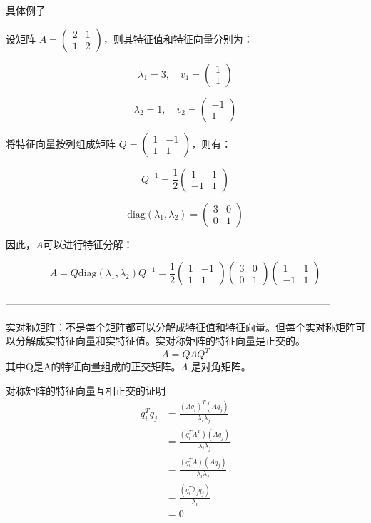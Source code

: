 \documentclass{article}
\begin{document}
具体例子

设矩阵 $A = \begin{pmatrix} 2 & 1 \\ 1 & 2 \end{pmatrix}$，则其特征值和特征向量分别为：

$$\lambda_1 = 3, \quad v_1 = \begin{pmatrix} 1 \\ 1 \end{pmatrix}$$

$$\lambda_2 = 1, \quad v_2 = \begin{pmatrix} -1 \\ 1 \end{pmatrix}$$

将特征向量按列组成矩阵 $Q = \begin{pmatrix} 1 & -1 \\ 1 & 1 \end{pmatrix}$，则有：

$$Q^{-1} = \frac{1}{2} \begin{pmatrix} 1 & 1 \\ -1 & 1 \end{pmatrix}$$

$$\text{diag}(\lambda_1, \lambda_2) = \begin{pmatrix} 3 & 0 \\ 0 & 1 \end{pmatrix}$$

因此，$A$可以进行特征分解：

$$A = Q \text{diag}(\lambda_1, \lambda_2) Q^{-1} = \frac{1}{2} \begin{pmatrix} 1 & -1 \\ 1 & 1 \end{pmatrix} \begin{pmatrix} 3 & 0 \\ 0 & 1 \end{pmatrix} \begin{pmatrix} 1 & 1 \\ -1 & 1 \end{pmatrix}$$

--------------------------------------------------------------------------------------------------

实对称矩阵：不是每个矩阵都可以分解成特征值和特征向量。但每个实对称矩阵可以分解成实特征向量和实特征值。实对称矩阵的特征向量是正交的。
$$A = Q \Lambda Q^T$$
其中Q是A的特征向量组成的正交矩阵。$\Lambda$ 是对角矩阵。

对称矩阵的特征向量互相正交的证明
$$
\begin{aligned}
    q_i^T q_j &= \frac{(Aq_i)^T(Aq_j)}{\lambda_i \lambda_j} \\
    &= \frac{(q_i^T A^T)(Aq_j)}{\lambda_i \lambda_j} \\
    &= \frac{(q_i^T A)(Aq_j)}{\lambda_i \lambda_j} \\
    &= \frac{(q_i^T \lambda_j q_j)}{\lambda_i} \\
    &= 0
\end{aligned}
$$
\end{document}
